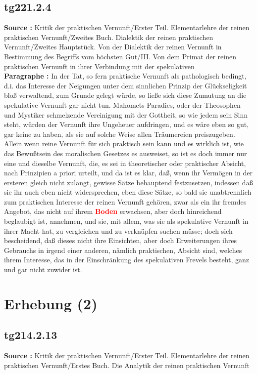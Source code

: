 \documentclass[a4paper,12pt,twoside]{book}
\newcommand{\match}[1]{\textcolor{red}{\textbf{#1}}}
\newcommand{\unnumberedsection}[1]{
	\section*{#1}
	\addcontentsline{toc}{section}{#1}
	\markright{#1}
}
\begin{document}
	\subsection*{tg221.2.4} 
	\textbf{Source : }Kritik der praktischen Vernunft/Erster Teil. Elementarlehre der reinen praktischen Vernunft/Zweites Buch. Dialektik der reinen praktischen Vernunft/Zweites Hauptstück. Von der Dialektik der reinen Vernunft in Bestimmung des Begriffs vom höchsten Gut/III. Von dem Primat der reinen praktischen Vernunft in ihrer Verbindung mit der spekulativen\\  
	
	\noindent\textbf{Paragraphe : }
	In der Tat, so fern praktische Vernunft als pathologisch bedingt, d.i. das Interesse der Neigungen unter dem sinnlichen Prinzip der Glückseligkeit bloß verwaltend, zum Grunde gelegt würde, so ließe sich diese Zumutung an die spekulative Vernunft gar nicht tun. Mahomets Paradies, oder der Theosophen und Mystiker schmelzende Vereinigung mit der Gottheit, so wie jedem sein Sinn steht, würden der Vernunft ihre Ungeheuer aufdringen, und es wäre eben so gut, gar keine zu haben, als sie auf solche Weise allen Träumereien preiszugeben. Allein wenn reine Vernunft für sich praktisch sein kann und es wirklich ist, wie das Bewußtsein des moralischen Gesetzes es ausweiset, so ist es doch immer nur eine und dieselbe Vernunft, die, es sei in theoretischer oder praktischer Absicht, nach Prinzipien a priori urteilt, und da ist es klar, daß, wenn ihr Vermögen in der ersteren gleich nicht zulangt, gewisse Sätze behauptend festzusetzen, indessen daß sie ihr auch eben nicht widersprechen, eben diese Sätze, so bald sie unabtrennlich zum praktischen Interesse der reinen Vernunft gehören, zwar als ein ihr fremdes Angebot, das nicht auf ihrem \match{Boden} erwachsen, aber doch hinreichend beglaubigt ist, annehmen, und sie, mit allem, was sie als spekulative Vernunft in ihrer Macht hat, zu vergleichen und zu verknüpfen suchen müsse; doch sich bescheidend, daß dieses nicht ihre Einsichten, aber doch Erweiterungen ihres Gebrauchs in irgend einer anderen, nämlich praktischen, Absicht sind, welches ihrem Interesse, das in der Einschränkung des spekulativen Frevels besteht, ganz und gar nicht zuwider ist. 
	
	\unnumberedsection{Erhebung (2)} 
	\subsection*{tg214.2.13} 
	\textbf{Source : }Kritik der praktischen Vernunft/Erster Teil. Elementarlehre der reinen praktischen Vernunft/Erstes Buch. Die Analytik der reinen praktischen Vernunft\\  
	
\end{document}
